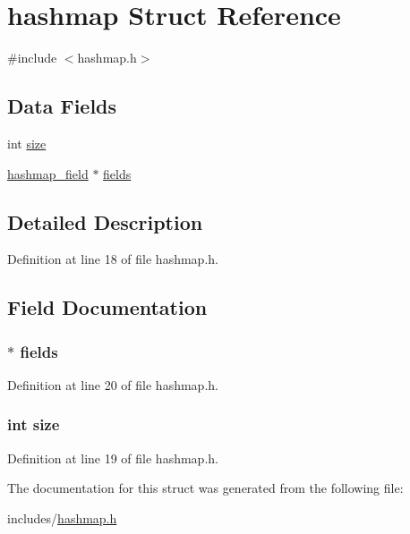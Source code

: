 \hypertarget{structhashmap}{\section{hashmap Struct Reference}
\label{structhashmap}
}


{\ttfamily \#include $<$hashmap.\+h$>$}

\subsection*{Data Fields}
\begin{DoxyCompactItemize}
\item 
int \hyperlink{structhashmap_a439227feff9d7f55384e8780cfc2eb82}{size}
\item 
\hyperlink{structhashmap__field}{hashmap\+\_\+field} $\ast$ \hyperlink{structhashmap_a6c8d7086f9d6c454298eb80cc8d679d2}{fields}
\end{DoxyCompactItemize}


\subsection{Detailed Description}


Definition at line 18 of file hashmap.\+h.



\subsection{Field Documentation}
\hypertarget{structhashmap_a6c8d7086f9d6c454298eb80cc8d679d2}{
\subsubsection[{fields}]{$\ast$ fields}}\label{structhashmap_a6c8d7086f9d6c454298eb80cc8d679d2}


Definition at line 20 of file hashmap.\+h.

\hypertarget{structhashmap_a439227feff9d7f55384e8780cfc2eb82}{
\subsubsection[{size}]{\setlength{\rightskip}{0pt plus 5cm}int size}}\label{structhashmap_a439227feff9d7f55384e8780cfc2eb82}


Definition at line 19 of file hashmap.\+h.



The documentation for this struct was generated from the following file\+:\begin{DoxyCompactItemize}
\item 
includes/\hyperlink{hashmap_8h}{hashmap.\+h}\end{DoxyCompactItemize}
